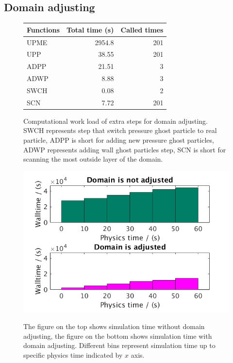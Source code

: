 \documentclass[procedia]{easychair}
\begin{document}
\subsection{Domain adjusting}
\begin{figure}
\CenterFloatBoxes
\begin{floatrow}
\ttabbox
{	  
    \begin{tabular}{lrr}
    \hline
    Functions & Total time (s) & Called times\\
    	\hline
    UPME & 2954.8 & 201 \\
    UPP & 38.55 &  201 \\
    ADPP & 21.51 & 3 \\
    ADWP  & 8.88 & 3 \\
    SWCH & 0.08 &  2 \\
    SCN  & 7.72 & 201 \\
    \hline
  \end{tabular}
}
{\caption{Computational work load of extra steps for domain adjusting. SWCH represents step that switch pressure ghost particle to real particle, ADPP is short for adding new pressure ghost particles, ADWP represents adding wall ghost particles step, SCN is short for scanning the most outside layer of the domain.}
\label{tab:Computational_cost_doamin_adj}}
\killfloatstyle
\ffigbox
{\includegraphics[scale=0.35]{adj_vs_no}}
{\caption{The figure on the top shows simulation time without domain adjusting, the figure on the bottom shows simulation time with domain adjusting. Different bins represent simulation time up to specific physics time indicated by $x$ axis.}
\label{fig:adj_vs_no}}
\end{floatrow}
\end{figure}
\end{document}
